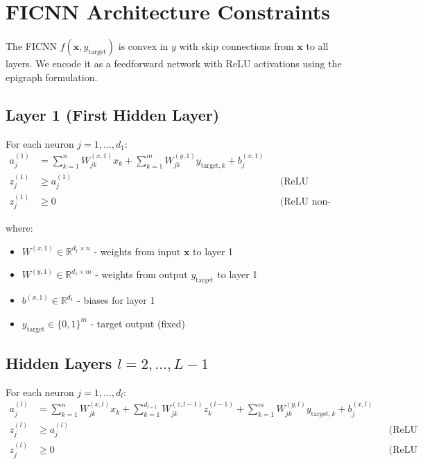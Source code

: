 \documentclass{article}
\begin{document}
\section{FICNN Architecture Constraints}

The FICNN $f(\mathbf{x}, y_{\text{target}})$ is convex in $y$ with skip connections from $\mathbf{x}$ to all layers. We encode it as a feedforward network with ReLU activations using the epigraph formulation.

\subsection{Layer 1 (First Hidden Layer)}

For each neuron $j = 1, \ldots, d_1$:
\begin{align}
a_j^{(1)} &= \sum_{k=1}^{n} W_{jk}^{(x,1)} x_k + \sum_{k=1}^{m} W_{jk}^{(y,1)} y_{\text{target},k} + b_j^{(x,1)} \\
z_j^{(1)} &\geq a_j^{(1)} && \text{(ReLU epigraph)} \\
z_j^{(1)} &\geq 0 && \text{(ReLU non-negativity)}
\end{align}

where:
\begin{itemize}
    \item $W^{(x,1)} \in \mathbb{R}^{d_1 \times n}$ - weights from input $\mathbf{x}$ to layer 1
    \item $W^{(y,1)} \in \mathbb{R}^{d_1 \times m}$ - weights from output $y_{\text{target}}$ to layer 1
    \item $b^{(x,1)} \in \mathbb{R}^{d_1}$ - biases for layer 1
    \item $y_{\text{target}} \in \{0, 1\}^m$ - target output (fixed)
\end{itemize}

\subsection{Hidden Layers $l = 2, \ldots, L-1$}

For each neuron $j = 1, \ldots, d_l$:
\begin{align}
a_j^{(l)} &= \sum_{k=1}^{n} W_{jk}^{(x,l)} x_k + \sum_{k=1}^{d_{l-1}} W_{jk}^{(z,l-1)} z_k^{(l-1)} + \sum_{k=1}^{m} W_{jk}^{(y,l)} y_{\text{target},k} + b_j^{(x,l)} \\
z_j^{(l)} &\geq a_j^{(l)} && \text{(ReLU epigraph)} \\
z_j^{(l)} &\geq 0 && \text{(ReLU non-negativity)}
\end{align}
\end{document}
